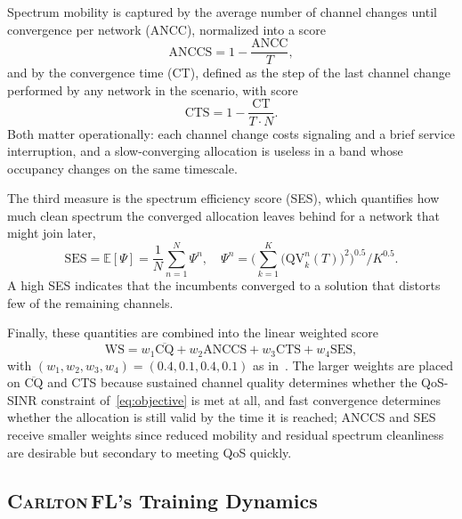 \documentclass[journal]{IEEEtran}
\newcommand{\OURS}{\textsc{Carlton\,FL}}
\begin{document}
Spectrum mobility is captured by the average number of channel changes until
convergence per network (ANCC), normalized into a score
\begin{equation}
\mathrm{ANCCS}=1-\frac{\mathrm{ANCC}}{T},
\label{eq:anccs}
\end{equation}
and by the convergence time (CT), defined as the step of the last channel
change performed by any network in the scenario, with score
\begin{equation}
\mathrm{CTS}=1-\frac{\mathrm{CT}}{T\cdot N}.
\label{eq:cts}
\end{equation}
Both matter operationally: each channel change costs signaling and a brief
service interruption, and a slow-converging allocation is useless in a band
whose occupancy changes on the same timescale.

The third measure is the spectrum efficiency score (SES), which quantifies how
much clean spectrum the converged allocation leaves behind for a network that
might join later,
\begin{equation}
\mathrm{SES}=\mathbb{E}[\Psi]=\frac{1}{N}\sum_{n=1}^{N}\Psi^{n},\quad
\Psi^{n}=\Big(\sum_{k=1}^{K}\big(\mathrm{QV}^{n}_{k}(T)\big)^{2}\Big)^{0.5}
\big/K^{0.5}.
\label{eq:ses}
\end{equation}
A high SES indicates that the incumbents converged to a solution that distorts
few of the remaining channels.

Finally, these quantities are combined into the linear weighted score
\begin{equation}
\mathrm{WS}=w_{1}\overline{\mathrm{CQ}}+w_{2}\mathrm{ANCCS}
+w_{3}\mathrm{CTS}+w_{4}\mathrm{SES},
\label{eq:ws}
\end{equation}
with $(w_{1},w_{2},w_{3},w_{4})=(0.4,0.1,0.4,0.1)$ as
in~\cite{cohen2024carlton}. The larger weights are placed on
$\overline{\mathrm{CQ}}$ and CTS because sustained channel quality determines
whether the QoS-SINR constraint of~\eqref{eq:objective} is met at all, and fast
convergence determines whether the allocation is still valid by the time it is
reached; ANCCS and SES receive smaller weights since reduced mobility and
residual spectrum cleanliness are desirable but secondary to meeting QoS
quickly.

\subsection{\texorpdfstring{\OURS{}'s Training Dynamics}{CARLTON FL's Training Dynamics}}
\label{subsec:exp_reward}
\end{document}
